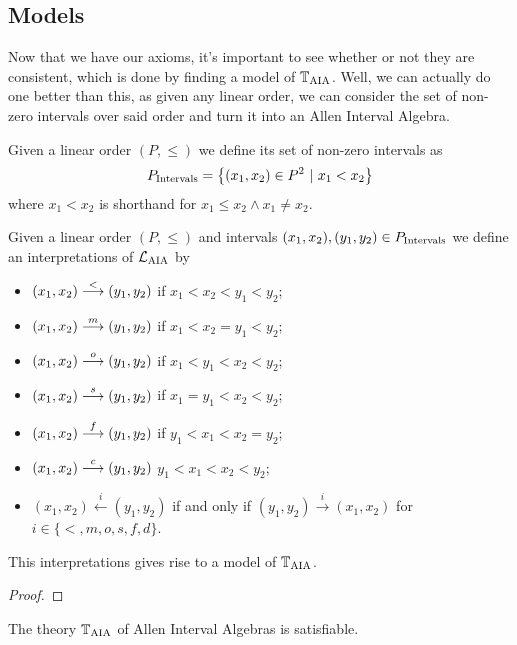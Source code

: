 \documentclass[../main.tex]{subfiles}
\begin{document}
\subsection{Models}%
\label{sub:models}

Now that we have our axioms, it's important to see whether or not they are consistent, which is done
by finding a model of $\mathbb{T}_\text{AIA}$. Well, we can actually do one better than this, as given any linear
order, we can consider the set of non-zero intervals over said order and turn it into an Allen
Interval Algebra.

\begin{defn}
  Given a linear order $(P,\leq)$ we define its set of non-zero intervals as
  \begin{equation*}
    P_\text{Intervals} = \left\{(x_1,x_2) \in P^2 \ |\ x_1 < x_2 \right\}
  \end{equation*}
  where $x_1<x_2$ is shorthand for $x_1 \leq x_2 \land x_1 \neq x_2$.
\end{defn}

\begin{prop}
  Given a linear order $(P,\leq)$ and intervals $(x_1,x_2),(y_1,y_2) \in P_\text{Intervals}$ we define an
  interpretations of $\mathcal{L}_\text{AIA}$ by
  \begin{itemize}
  \item $(x_1,x_2) \overset{<}{\longrightarrow} (y_1,y_2)$ if $x_1<x_2<y_1<y_2$;
  \item $(x_1,x_2) \overset{m}{\longrightarrow} (y_1,y_2)$ if $x_1<x_2=y_1<y_2$;
  \item $(x_1,x_2) \overset{o}{\longrightarrow} (y_1,y_2)$ if $x_1<y_1<x_2<y_2$;
  \item $(x_1,x_2) \overset{s}{\longrightarrow} (y_1,y_2)$ if $x_1=y_1<x_2<y_2$;
  \item $(x_1,x_2) \overset{f}{\longrightarrow} (y_1,y_2)$ if $y_1<x_1<x_2=y_2$;
  \item $(x_1,x_2) \overset{c}{\longrightarrow} (y_1,y_2)$ $y_1<x_1<x_2<y_2$;
  \item $(x_1,x_2) \overset{i}{\longleftarrow} (y_1,y_2)$ if and only if
    $(y_1,y_2) \overset{i}{\longrightarrow} (x_1,x_2)$ for $i \in \{<,m,o,s,f,d\}$.
  \end{itemize}
  This interpretations gives rise to a model of $\mathbb{T}_\text{AIA}$.
\end{prop}

\begin{proof}
\end{proof}

\begin{cor}
  The theory $\mathbb{T}_\text{AIA}$ of Allen Interval Algebras is satisfiable.
\end{cor}
\end{document}

